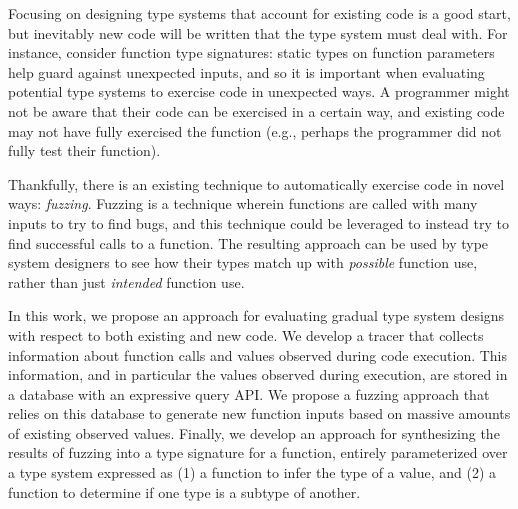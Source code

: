 \documentclass[sigplan,anonymous,review]{acmart}
\begin{document}
Focusing on designing type systems that account for existing code is a good start, but inevitably new code will be written that the type system must deal with.
For instance, consider function type signatures: static types on function parameters help guard against unexpected inputs, and so it is important when evaluating potential type systems to exercise code in unexpected ways. 
A programmer might not be aware that their code can be exercised in a certain way, and existing code may not have fully exercised the function (e.g., perhaps the programmer did not fully test their function).

Thankfully, there is an existing technique to automatically exercise code in novel ways: \textit{fuzzing}.
Fuzzing is a technique wherein functions are called with many inputs to try to find bugs, and this technique could be leveraged to instead try to find successful calls to a function.
The resulting approach can be used by type system designers to see how their types match up with \textit{possible} function use, rather than just \textit{intended} function use.

In this work, we propose an approach for evaluating gradual type system designs with respect to both existing and new code.
We develop a tracer that collects information about function calls and values observed during code execution.
This information, and in particular the values observed during execution, are stored in a database with an expressive query API.
We propose a fuzzing approach that relies on this database to generate new function inputs based on massive amounts of existing observed values.
Finally, we develop an approach for synthesizing the results of fuzzing into a type signature for a function, entirely parameterized over a type system expressed as (1) a function to infer the type of a value, and (2) a function to determine if one type is a subtype of another.
\end{document}
